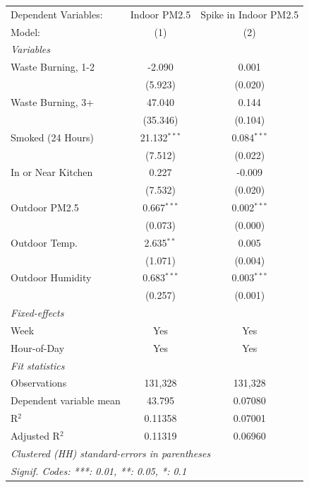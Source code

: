 
\begingroup
\centering
\begin{tabular}{lcc}
   \tabularnewline \midrule \midrule
   Dependent Variables:    & Indoor PM2.5   & Spike in Indoor PM2.5\\  
   Model:                  & (1)            & (2)\\  
   \midrule
   \emph{Variables}\\
   Waste Burning, 1-2      & -2.090         & 0.001\\   
                           & (5.923)        & (0.020)\\   
   Waste Burning, 3+       & 47.040         & 0.144\\   
                           & (35.346)       & (0.104)\\   
   Smoked (24 Hours)       & 21.132$^{***}$ & 0.084$^{***}$\\   
                           & (7.512)        & (0.022)\\   
   In or Near Kitchen      & 0.227          & -0.009\\   
                           & (7.532)        & (0.020)\\   
   Outdoor PM2.5           & 0.667$^{***}$  & 0.002$^{***}$\\   
                           & (0.073)        & (0.000)\\   
   Outdoor Temp.           & 2.635$^{**}$   & 0.005\\   
                           & (1.071)        & (0.004)\\   
   Outdoor Humidity        & 0.683$^{***}$  & 0.003$^{***}$\\   
                           & (0.257)        & (0.001)\\   
   \midrule
   \emph{Fixed-effects}\\
   Week                    & Yes            & Yes\\  
   Hour-of-Day             & Yes            & Yes\\  
   \midrule
   \emph{Fit statistics}\\
   Observations            & 131,328        & 131,328\\  
   Dependent variable mean & 43.795         & 0.07080\\  
   R$^2$                   & 0.11358        & 0.07001\\  
   Adjusted R$^2$          & 0.11319        & 0.06960\\  
   \midrule \midrule
   \multicolumn{3}{l}{\emph{Clustered (HH) standard-errors in parentheses}}\\
   \multicolumn{3}{l}{\emph{Signif. Codes: ***: 0.01, **: 0.05, *: 0.1}}\\
\end{tabular}
\par\endgroup


